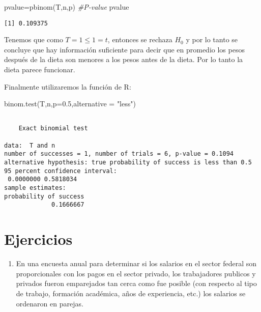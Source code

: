 \documentclass[
  a4paper,
  oneside,
  openany]{book}
\newenvironment{Shaded}{\begin{snugshade}}{\end{snugshade}}
\newcommand{\AttributeTok}[1]{\textcolor[rgb]{0.77,0.63,0.00}{#1}}
\newcommand{\CommentTok}[1]{\textcolor[rgb]{0.56,0.35,0.01}{\textit{#1}}}
\newcommand{\FloatTok}[1]{\textcolor[rgb]{0.00,0.00,0.81}{#1}}
\newcommand{\FunctionTok}[1]{\textcolor[rgb]{0.00,0.00,0.00}{#1}}
\newcommand{\NormalTok}[1]{#1}
\newcommand{\OtherTok}[1]{\textcolor[rgb]{0.56,0.35,0.01}{#1}}
\newcommand{\StringTok}[1]{\textcolor[rgb]{0.31,0.60,0.02}{#1}}
\providecommand{\tightlist}{%
  \setlength{\itemsep}{0pt}\setlength{\parskip}{0pt}}
\begin{document}
\begin{Shaded}
\begin{Highlighting}[]
\NormalTok{pvalue}\OtherTok{=}\FunctionTok{pbinom}\NormalTok{(T,n,p)       }\CommentTok{\#P{-}value}
\NormalTok{pvalue}
\end{Highlighting}
\end{Shaded}

\begin{verbatim}
[1] 0.109375
\end{verbatim}

Tenemos que como \(T=1\leq 1 =t\), entonces se rechaza \(H_0\) y por lo tanto se concluye que hay información suficiente para decir que en promedio los pesos después de la dieta son menores a los pesos antes de la dieta. Por lo tanto la dieta parece funcionar.

Finalmente utilizaremos la función de R:

\begin{Shaded}
\begin{Highlighting}[]
\FunctionTok{binom.test}\NormalTok{(T,n,}\AttributeTok{p=}\FloatTok{0.5}\NormalTok{,}\AttributeTok{alternative =} \StringTok{"less"}\NormalTok{)}
\end{Highlighting}
\end{Shaded}

\begin{verbatim}

    Exact binomial test

data:  T and n
number of successes = 1, number of trials = 6, p-value = 0.1094
alternative hypothesis: true probability of success is less than 0.5
95 percent confidence interval:
 0.0000000 0.5818034
sample estimates:
probability of success 
             0.1666667 
\end{verbatim}

\hypertarget{ejercicios-2}{%
\section{Ejercicios}\label{ejercicios-2}}

\begin{enumerate}
\def\labelenumi{\arabic{enumi}.}
\tightlist
\item
  En una encuesta anual para determinar si los salarios en el sector federal son proporcionales con los pagos en el sector privado, los trabajadores publicos y privados fueron emparejados tan cerca como fue posible (con respecto al tipo de trabajo, formación académica, años de experiencia, etc.) los salarios se ordenaron en parejas.
\end{enumerate}
\end{document}
